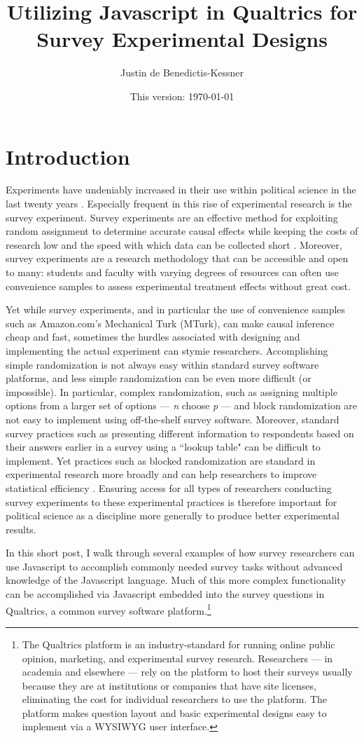 \documentclass[12pt]{article}
\title{Utilizing Javascript in Qualtrics for Survey Experimental Designs}
\author{Justin de Benedictis-Kessner}
\date{This version: \today}                                           %
\begin{document}
\maketitle
\section{Introduction}

Experiments have undeniably increased in their use within political science in the last twenty years \citep{druckman2006growth}. Especially frequent in this rise of experimental research is the survey experiment. Survey experiments are an effective method for exploiting random assignment to determine accurate causal effects while keeping the costs of research low and the speed with which data can be collected short \citep{mullinix2015generalizability}. Moreover, survey experiments are a research methodology that can be accessible and open to many: students and faculty with varying degrees of resources can often use convenience samples to assess experimental treatment effects without great cost.

Yet while survey experiments, and in particular the use of convenience samples such as Amazon.com's Mechanical Turk (MTurk), can make causal inference cheap and fast, sometimes the hurdles associated with designing and implementing the actual experiment can stymie researchers. Accomplishing simple randomization is not always easy within standard survey software platforms, and less simple randomization can be even more difficult (or impossible). In particular, complex randomization, such as assigning multiple options from a larger set of options --- \emph{n} choose \emph{p} --- and block randomization are not easy to implement using off-the-shelf survey software. Moreover, standard survey practices such as presenting different information to respondents based on their answers earlier in a survey using a ``lookup table" can be difficult to implement. Yet practices such as blocked randomization are standard in experimental research more broadly and can help researchers to improve statistical efficiency \citep[e.g.,][]{horiuchi2007designing, imai2008misunderstandings, moore2012multivariate}. Ensuring access for all types of researchers conducting survey experiments to these experimental practices is therefore important for political science as a discipline more generally to produce better experimental results.

In this short post, I walk through several examples of how survey researchers can use Javascript to accomplish commonly needed survey tasks without advanced knowledge of the Javascript language. Much of this more complex functionality can be accomplished via Javascript embedded into the survey questions in Qualtrics, a common survey software platform.\footnote{The Qualtrics platform is an industry-standard for running online public opinion, marketing, and experimental survey research. Researchers --- in academia and elsewhere ---  rely on the platform to host their surveys usually because they are at institutions or companies that have site licenses, eliminating the cost for individual researchers to use the platform. The platform makes question layout and basic experimental designs easy to implement via a WYSIWYG user interface.}
\end{document}
